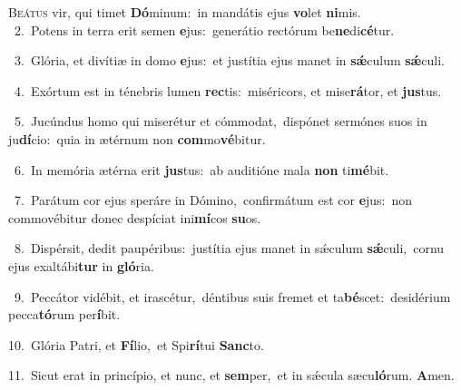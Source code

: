 \lettrine{\initial\textcolor{\initialcolor}{B}}{eátus} vir, qui timet \textbf{Dó}\-minum:~\star in mandátis ejus \textbf{vo}\-let \textbf{ni}\-mis.\\
{\numbfont\textcolor{\numbcolor}{~2.}}~Potens in terra erit semen \textbf{e}\-jus:~\star generátio rectórum be\-\textbf{ne}\-di\-\textbf{cé}\-tur.\par
{\numbfont\textcolor{\numbcolor}{~3.}}~Glória, et divítiæ in domo \textbf{e}\-jus:~\star et justítia ejus manet in \textbf{sǽ}\-culum \textbf{sǽ}\-culi.\par
{\numbfont\textcolor{\numbcolor}{~4.}}~Exórtum est in ténebris lumen \textbf{rec}\-tis:~\star miséricors, et mise\-\textbf{rá}\-tor, et \textbf{jus}\-tus.\par
{\numbfont\textcolor{\numbcolor}{~5.}}~Jucúndus homo qui miserétur et cómmodat,~\dagger dispónet sermónes suos in ju\-\textbf{dí}\-cio:~\star quia in ætérnum non \textbf{com}\-mo\-\textbf{vé}\-bitur.\par
{\numbfont\textcolor{\numbcolor}{~6.}}~In memória ætérna erit \textbf{jus}\-tus:~\star ab auditióne mala \textbf{non} ti\-\textbf{mé}\-bit.\par
{\numbfont\textcolor{\numbcolor}{~7.}}~Parátum cor ejus speráre in Dómino,~\dagger confirmátum est cor \textbf{e}\-jus:~\star non commovébitur donec despíciat ini\-\textbf{mí}\-cos \textbf{su}\-os.\par
{\numbfont\textcolor{\numbcolor}{~8.}}~Dispérsit, dedit paupéribus:~\dagger justítia ejus manet in sǽculum \textbf{sǽ}\-culi,~\star cornu ejus exaltábi\textbf{tur} in \textbf{gló}\-ria.\par
{\numbfont\textcolor{\numbcolor}{~9.}}~Peccátor vidébit, et irascétur,~\dagger déntibus suis fremet et ta\-\textbf{bé}\-scet:~\star desidérium pecca\-\textbf{tó}\-rum per\-\textbf{í}\-bit.\par
{\numbfont\textcolor{\numbcolor}{10.}}~Glória Patri, et \textbf{Fí}\-lio,~\star et Spi\-\textbf{rí}\-tui \textbf{Sanc}\-to.\par
{\numbfont\textcolor{\numbcolor}{11.}}~Sicut erat in princípio, et nunc, et \textbf{sem}\-per,~\star et in sǽcula sæcu\-\textbf{ló}\-rum. \textbf{A}\-men.\par
